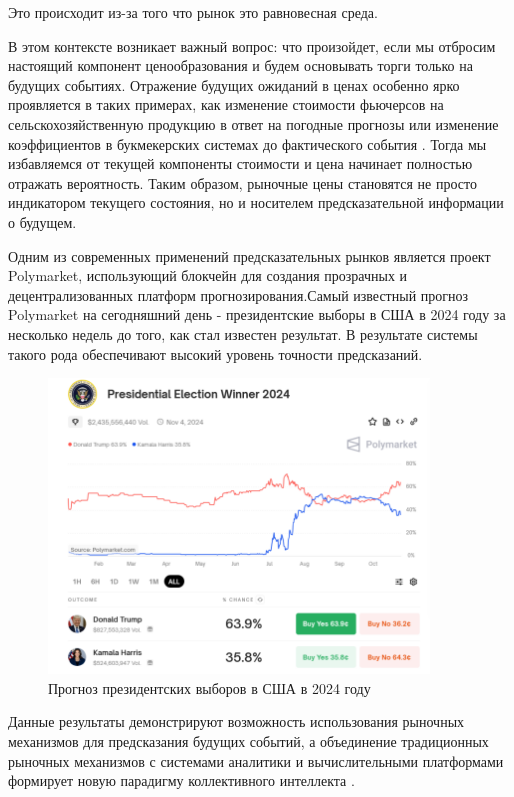 \documentclass[
    14pt,
    specialist,
    candidate, %
    subf, %
    href,
    dotsinheaders=false
]{disser}
\begin{document}
Это происходит из-за того что рынок это равновесная среда.

В этом контексте возникает важный вопрос: что произойдет, если мы отбросим настоящий компонент ценообразования и будем основывать торги только на будущих событиях. Отражение будущих ожиданий в ценах особенно ярко проявляется в таких примерах, как изменение стоимости фьючерсов на сельскохозяйственную продукцию в ответ на погодные прогнозы или изменение коэффициентов в букмекерских системах до фактического события \cite{wolfers2019price}. Тогда мы избавляемся от текущей компоненты стоимости и цена начинает полностью отражать вероятность. Таким образом, рыночные цены становятся не просто индикатором текущего состояния, но и носителем предсказательной информации о будущем.

Одним из современных применений предсказательных рынков является проект Polymarket, использующий блокчейн для создания прозрачных и децентрализованных платформ прогнозирования.Самый известный прогноз Polymarket на сегодняшний день - президентские выборы в США в 2024 году за несколько недель до того, как стал известен результат. В результате системы такого рода обеспечивают высокий уровень точности предсказаний.

\begin{figure}[H]
  \centering
  \includegraphics[width=0.9\textwidth]{./assets/polymarket-elections.png}
  \caption{Прогноз президентских выборов в США в 2024 году}
  \label{fig:polymarket-elections}
\end{figure}

Данные результаты демонстрируют возможность использования рыночных механизмов для предсказания будущих событий, а объединение традиционных рыночных механизмов с системами аналитики и вычислительными платформами формирует новую парадигму коллективного интеллекта \cite{berg2020prediction}.
\end{document}

